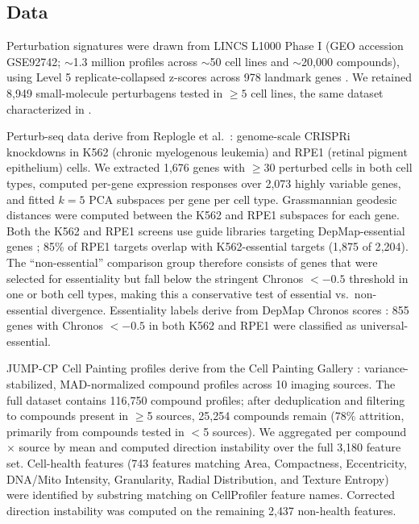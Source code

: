 \documentclass{article}
\begin{document}
\subsection{Data}

Perturbation signatures were drawn from LINCS L1000 Phase I (GEO accession
GSE92742; $\sim$1.3 million profiles across $\sim$50 cell lines and
$\sim$20{,}000 compounds), using Level 5 replicate-collapsed z-scores
across 978 landmark genes \citep{subramanian2017next}. We retained 8{,}949
small-molecule perturbagens tested in $\geq5$ cell lines, the same dataset
characterized in \citet{tower2026bracket}.

Perturb-seq data derive from Replogle et al.\
\citep{replogle2022mapping}: genome-scale CRISPRi knockdowns in K562
(chronic myelogenous leukemia) and RPE1 (retinal pigment epithelium)
cells. We extracted 1{,}676 genes with $\geq$30 perturbed cells in both
cell types, computed per-gene expression responses over 2{,}073 highly
variable genes, and fitted $k = 5$ PCA subspaces per gene per cell type.
Grassmannian geodesic distances were computed between the K562 and RPE1
subspaces for each gene. Both the K562 and RPE1 screens use guide libraries
targeting DepMap-essential genes \citep{replogle2022mapping}; 85\% of RPE1
targets overlap with K562-essential targets (1{,}875 of 2{,}204). The
``non-essential'' comparison group therefore consists of genes that were
selected for essentiality but fall below the stringent Chronos $< -0.5$
threshold in one or both cell types, making this a conservative test of
essential vs.\ non-essential divergence. Essentiality labels derive from
DepMap Chronos scores \citep{dempster2021chronos}: 855 genes with Chronos
$< -0.5$ in both K562 and RPE1 were classified as universal-essential.

JUMP-CP Cell Painting profiles derive from the Cell Painting Gallery
\citep{chandrasekaran2023jump}: variance-stabilized, MAD-normalized
compound profiles across 10 imaging sources. The full dataset contains
116{,}750 compound profiles; after deduplication and filtering to compounds
present in $\geq$5 sources, 25{,}254 compounds remain (78\% attrition,
primarily from compounds tested in $<$5 sources). We aggregated per
compound $\times$ source by mean and computed direction instability over
the full 3{,}180 feature set. Cell-health features (743 features matching Area, Compactness,
Eccentricity, DNA/Mito Intensity, Granularity, Radial Distribution, and
Texture Entropy) were identified by substring matching on CellProfiler
feature names. Corrected direction instability was computed on the remaining
2{,}437 non-health features.
\end{document}
